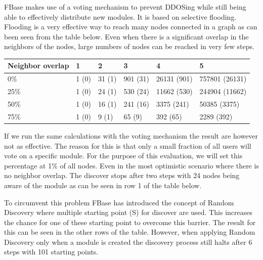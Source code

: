 FBase makes use of a voting mechanism to prevent DDOSing while still being able to effectively distribute new modules. It is based on selective flooding. Flooding is a very effective way to reach many nodes connected in a graph as can been seen from the table below. Even when there is a significant overlap in the neighbors of the nodes, large numbers of nodes can be reached in very few steps.
\begin{table}[h!]
	\begin{tabular}{l|lllll}
		\toprule
		Neighbor overlap & 1     & 2      & 3        & 4           & 5              \\ \midrule
		0\%              & 1 (0) & 31 (1) & 901 (31) & 26131 (901) & 757801 (26131) \\
		25\%             & 1 (0) & 24 (1) & 530 (24) & 11662 (530) & 244904 (11662) \\
		50\%             & 1 (0) & 16 (1) & 241 (16) & 3375 (241)  & 50385 (3375)   \\
		75\%             & 1 (0)                      & 9 (1)  & 65 (9)   & 392 (65)    & 2289 (392) \\ \bottomrule   
	\end{tabular}
\end{table}

If we run the same calculations with the voting mechanism the result are however not as effective. The reason for this is that only a small fraction of all users will vote on a specific module. For the purpose of this evaluation, we will set this percentage at 1\% of all nodes. Even in the most optimistic scenario where there is no neighbor overlap. The discover stops after two steps with 24 nodes being aware of the module as can be seen in row 1 of the table below.

To circumvent this problem FBase has introduced the concept of Random Discovery where multiple starting point (S) for discover are used. This increases the chance for one of these starting point to overcome this barrier. The result for this can be seen in the other rows of the table. However, when applying Random Discovery only when a module is created the discovery process still halts after 6 steps with 101 starting points.

